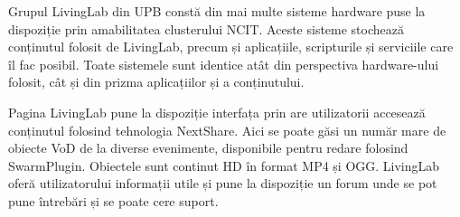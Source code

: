 Grupul LivingLab din UPB constă din mai multe sisteme hardware puse la
dispoziție prin amabilitatea clusterului NCIT. Aceste sisteme stochează
conținutul folosit de LivingLab, precum și aplicațiile, scripturile și
serviciile care îl fac posibil. Toate sistemele sunt identice atât din
perspectiva hardware-ului folosit, cât și din prizma aplicațiilor și a
conținutului.

Pagina LivingLab pune la
dispoziție interfața prin are utilizatorii accesează conținutul folosind
tehnologia NextShare. Aici se poate găsi un număr mare de obiecte VoD de la
diverse evenimente, disponibile pentru redare folosind SwarmPlugin. Obiectele
sunt continut HD în format MP4 și OGG. LivingLab oferă utilizatorului informații
utile și pune la dispoziție un forum unde se pot pune întrebări și se poate
cere suport.

